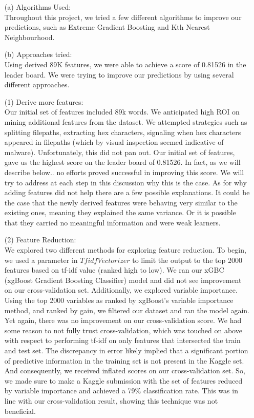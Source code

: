 \documentclass[12pt]{article}
\newcommand\tab[1][0.5cm]{\hspace*{#1}}
\begin{document}
\begin{enumerate}
\item[(a)]
Algorithms Used:\\
\tab Throughout this project, we tried a few different algorithms to improve our predictions, such as Extreme Gradient Boosting and Kth Nearest Neighbourhood. 

\item[(b)]
Approaches tried:\\
\tab Using derived 89K features, we were able to achieve a score of 0.81526 in the leader board. We were trying to improve our predictions by using several different approaches. 

\item[(1)]
Derive more features:\\
\tab 
Our initial set of features included 89k words.  We anticipated high ROI on mining additional features from the dataset. We attempted strategies such as splitting filepaths, extracting hex characters, signaling when hex characters appeared in filepaths (which by visual inspection seemed indicative of malware).  Unfortunately, this did not pan out.  Our initial set of features, gave us the highest score on the leader board of 0.81526.  In fact, as we will describe below.. no efforts proved successful in improving this score.  We will try to address at each step in this discussion why this is the case.  As for why adding features did not help there are a few possible explanations.  It could be the case that the newly derived features were behaving very similar to the existing ones, meaning they explained the same variance.  Or it is possible that they carried no meaningful information and were weak learners.  

\item[(2)]
Feature Reduction:\\ 
\tab We explored two different methods for exploring feature reduction. To begin, we used a parameter in $TfidfVectorizer$  to limit the output to the top 2000 features based on tf-idf value (ranked high to low).  We ran our xGBC (xgBoost Gradient Boosting Classifier) model and did not see improvement on our cross-validation set.  Additionally, we explored variable importance.  Using the top 2000 variables as ranked by xgBoost's variable importance method, and ranked by gain, we filtered our dataset and ran the model again.  Yet again, there was no improvement on our cross-validation score.  We had some reason to not fully trust cross-validation, which was touched on above with respect to performing tf-idf on only features that intersected the train and test set.  The discrepancy in error likely implied that a significant portion of predictive information in the training set is not present in the Kaggle set.  And consequently, we received inflated scores on our cross-validation set. So, we made sure to make a Kaggle submission with the set of features reduced by variable importance and achieved a 79\% classification rate.  This was in line with our cross-validation result, showing this technique was not beneficial.


\end{enumerate}
\end{document}
